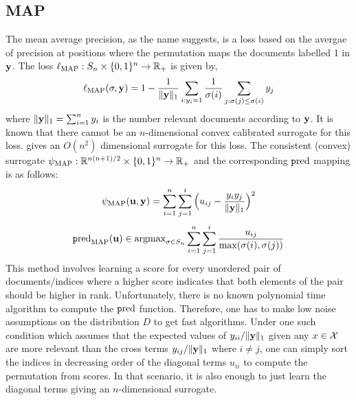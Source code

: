 \subsection{MAP}
The mean average precision, as the name suggests, is a loss based on the avergae of precision at positions where the permutation maps the documents labelled 1 in ${\mathbf y}$. The loss $\ell_{\text{MAP}}:S_n \times \{0,1\}^n \to {\mathbb R}_+$ is given by,
$$\ell_{\text{MAP}}(\sigma,{\mathbf y}) = 1 - \frac{1}{\lVert{\mathbf y}\rVert_1}\sum_{i:y_i = 1}\frac{1}{\sigma(i)}\sum_{j:\sigma(j) \leq \sigma(i)}y_j$$
where $\lVert{\mathbf y}\rVert_1 = \sum_{i=1}^ny_i$ is the number relevant documents according to ${\mathbf y}$. It is known that there cannot be an $n$-dimensional convex calibrated surrogate for this loss. \cite{ramaswamy2013convex} gives an $O(n^2)$ dimensional surrogate for this loss. The consistent (convex) surrogate $\psi_{\text{MAP}}:  {\mathbb R}^{n(n+1)/2} \times \{0,1\}^n \to {\mathbb R}_+$ and the corresponding $\text{\texttt pred}$ mapping is as follows:
$$\psi_{\text{MAP}}({\mathbf u},{\mathbf y}) = \sum_{i=1}^n\sum_{j=1}^i\Big(u_{ij} - \frac{y_iy_j}{\lVert{\mathbf y}\rVert_1}\Big)^2$$
$$\text{\texttt pred}_{\text{MAP}}({\mathbf u}) \in \textup{\textrm{argmax}}_{\sigma\in S_n}\sum_{i=1}^n\sum_{j=1}^i \frac{u_{ij}}{\max(\sigma(i),\sigma(j))}$$
This method involves learning a score for every unordered pair of documents/indices where a higher score indicates that both elements of the pair should be higher in rank. Unfortunately, there is no known polynomial time algorithm to compute the $\text{\texttt pred}$ function. Therefore, one has to make low noise assumptions on the distribution $D$ to get fast algorithms. Under one such condition which assumes that the expected values of $y_{ii}/\lVert{\mathbf y}\rVert_1$ given any $x \in {\mathcal X}$ are more relevant than the cross terms $y_{ij}/\lVert{\mathbf y}\rVert_1$ where $i \neq j$, one can simply sort the indices in decreasing order of the diagonal terms $u_{ii}$ to compute the permutation from scores. In that scenario, it is also enough to just learn the diagonal terms giving an $n$-dimensional surrogate.  